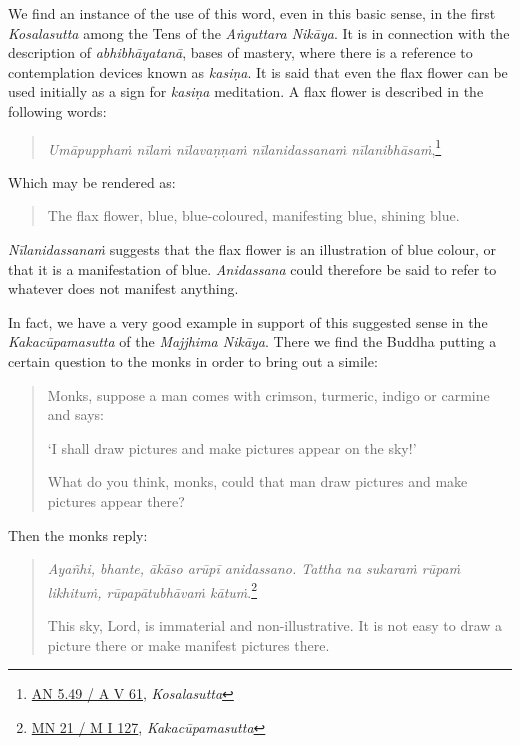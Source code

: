 We find an instance of the use of this word, even in this basic sense, in the first \emph{Kosalasutta} among the Tens of the \emph{Aṅguttara Nikāya}. It is in connection with the description of \emph{abhibhāyatanā}, bases of mastery, where there is a reference to contemplation devices known as \emph{kasiṇa}. It is said that even the flax flower can be used initially as a sign for \emph{kasiṇa} meditation. A flax flower is described in the following words:

\begin{quote}
\emph{Umāpupphaṁ nīlaṁ nīlavaṇṇaṁ nīlanidassanaṁ nīlanibhāsaṁ},\footnote{\href{https://suttacentral.net/an5.49/pli/ms}{AN 5.49 / A V 61}, \emph{Kosalasutta}}
\end{quote}

Which may be rendered as:

\begin{quote}
The flax flower, blue, blue-coloured, manifesting blue, shining blue.
\end{quote}

\emph{Nīlanidassanaṁ} suggests that the flax flower is an illustration of blue colour, or that it is a manifestation of blue. \emph{Anidassana} could therefore be said to refer to whatever does not manifest anything.

In fact, we have a very good example in support of this suggested sense in the \emph{Kakacūpamasutta} of the \emph{Majjhima Nikāya}. There we find the Buddha putting a certain question to the monks in order to bring out a simile:

\begin{quote}
Monks, suppose a man comes with crimson, turmeric, indigo or carmine and says:

`I shall draw pictures and make pictures appear on the sky!'

What do you think, monks, could that man draw pictures and make pictures appear there?
\end{quote}

Then the monks reply:

\begin{quote}
\emph{Ayañhi, bhante, ākāso arūpī anidassano. Tattha na sukaraṁ rūpaṁ likhituṁ, rūpapātubhāvaṁ kātuṁ}.\footnote{\href{https://suttacentral.net/mn21/pli/ms}{MN 21 / M I 127}, \emph{Kakacūpamasutta}}

This sky, Lord, is immaterial and non-illustrative. It is not easy to draw a picture there or make manifest pictures there.
\end{quote}

